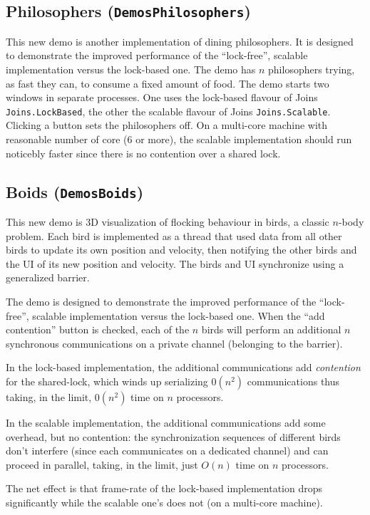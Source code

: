 \documentclass{article}
\newcommand{\demo}[1]{\texorpdfstring{{(\texttt{Demos{\symbol{92}}#1})}}{}}
\begin{document}
\subsection{Philosophers \demo{Philosophers}}

This new demo is another implementation of dining philosophers. It is
designed to demonstrate the improved performance of the ``lock-free'',
scalable implementation versus the lock-based one.  The demo has $n$
philosophers trying, as fast they can, to consume a fixed amount of
food. The demo starts two windows in separate processes. One uses the
lock-based flavour of Joins \lstinline{Joins.LockBased}, the other the
scalable flavour of Joins \lstinline{Joins.Scalable}.  Clicking a
button sets the philosophers off. On a multi-core machine with reasonable number of core (6 or more), the
scalable implementation should run noticebly faster since there is no
contention over a shared lock.

\subsection{Boids \demo{Boids}}

This new demo is 3D visualization of flocking behaviour in birds, a classic $n$-body problem.
Each bird is implemented as a thread that used data from all other birds to update its own position and velocity, then
notifying the other birds and the UI of its new position and velocity. The birds and UI synchronize using a generalized barrier.

The demo is designed to demonstrate the improved performance of the ``lock-free'',
scalable implementation versus the lock-based one. When the ``add contention'' button is checked, 
each  of the $n$ birds will perform an additional $n$  synchronous communications on a private channel (belonging to the barrier).

In the lock-based implementation, the additional communications add \emph{contention} for the shared-lock, which winds up serializing $0(n^2)$ communications thus taking, in the limit, 
$0(n^2)$ time on $n$ processors.

In the scalable implementation, the additional communications add some overhead, but no contention: the synchronization sequences of different birds
don't interfere (since each communicates on a dedicated channel) and can proceed in parallel, taking, in the limit, just $O(n)$ time on $n$ processors.

The net effect is that frame-rate of the lock-based implementation drops significantly while the scalable one's does not (on a multi-core machine).
\end{document}
